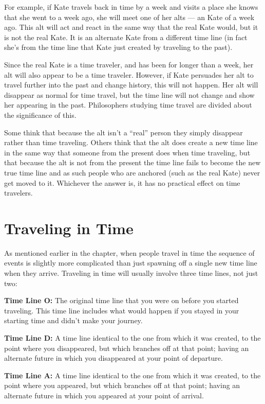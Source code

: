 \begin{multicols*}{2}
For example, if Kate travels back in time by a week and visits a place she knows that she went to a week ago, she will meet one of her alts — an Kate of a week ago. This alt will act and react in the same way that the real Kate would, but it is not the real Kate. It is an alternate Kate from a different time line (in fact she’s from the time line that Kate just created by traveling to the past). 

Since the real Kate is a time traveler, and has been for longer than a week, her alt will also appear to be a time traveler. However, if Kate persuades her alt to travel further into the past and change history, this will not happen. Her alt will disappear as normal for time travel, but the time line will not change and show her appearing in the past. Philosophers studying time travel are divided about the significance of this.

Some think that because the alt isn’t a “real” person they simply disappear rather than time traveling. Others think that the alt does create a new time line in the same way that someone from the present does when time traveling, but that because the alt is not from the present the time line fails to become the new true time line and as such people who are anchored (such as the real Kate) never get moved to it. Whichever the answer is, it has no practical effect on time travelers.

\section{Traveling in Time}
As mentioned earlier in the chapter, when people travel in time the sequence of events is slightly more complicated than just spawning off a single new time line when they arrive. Traveling in time will usually involve three time lines, not just two:

\textbf{Time Line O:} The original time line that you were on before you started traveling. This time line includes what would happen if you stayed in your starting time and didn’t make your journey. 

\textbf{Time Line D:} A time line identical to the one from which it was created, to the point where you disappeared, but which branches off at that point; having an alternate future in which you disappeared at your point of departure.

\textbf{Time Line A:} A time line identical to the one from which it was created, to the point where you appeared, but which branches off at that point; having an alternate future in which you appeared at your point of arrival.


\end{multicols*}
